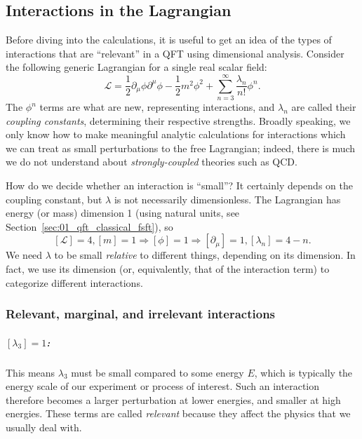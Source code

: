 \subsection{Interactions in the Lagrangian}
\label{sec:01_qft_interactions_lagrangian}

Before diving into the calculations, it is useful to get an idea of the types of interactions that are ``relevant'' in a QFT using dimensional analysis.
Consider the following generic Lagrangian for a single real scalar field:
\begin{equation}
    \label{eq:01_qft_interactions_lagrangian}
    \mathcal L = \frac{1}{2}\partial_\mu\phi\partial^\mu\phi - \frac{1}{2}m^2\phi^2 + \sum_{n=3}^\infty \frac{\lambda_n}{n!}\phi^n.
\end{equation}
The $\phi^n$ terms are what are new, representing interactions, and $\lambda_n$ are called their \textit{coupling constants}, determining their respective strengths.
Broadly speaking, we only know how to make meaningful analytic calculations for interactions which we can treat as small perturbations to the free Lagrangian; indeed, there is much we do not understand about \textit{strongly-coupled} theories such as QCD.

How do we decide whether an interaction is ``small''?
It certainly depends on the coupling constant, but $\lambda$ is not necessarily dimensionless.
The Lagrangian has energy (or mass) dimension 1 (using natural units, see Section~\ref{sec:01_qft_classical_fsft}), so
\begin{equation}
    \label{eq:01_qft_interactions_lagrangian_dimension}
    [\mathcal L] = 4, [m] = 1 \Rightarrow [\phi] = 1 \Rightarrow [\partial_\mu] = 1, [\lambda_n] = 4 - n.
\end{equation}
We need $\lambda$ to be small \textit{relative} to different things, depending on its dimension.
In fact, we use its dimension (or, equivalently, that of the interaction term) to categorize different interactions.

\subsubsection{Relevant, marginal, and irrelevant interactions}

\subparagraph{$[\lambda_3] = 1$:} This means $\lambda_3$ must be small compared to some energy $E$, which is typically the energy scale of our experiment or process of interest.
Such an interaction therefore becomes a larger perturbation at lower energies, and smaller at high energies.
These terms are called \textit{relevant} because they affect the physics that we usually deal with.

